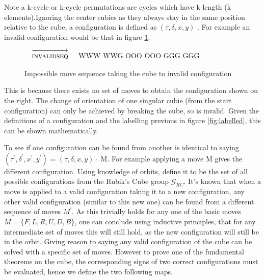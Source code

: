 \documentclass{article}
\newcounter{theo}[section]\setcounter{theo}{0}
\newcounter{lem}[section]\setcounter{lem}{0}
\begin{document}
Note a k-cycle or k-cycle permutations are cycles which have k length (k elements).\newline Ignoring the center cubies as they always stay in the same position relative to the cube, a configuration is defined as \textbf{$(\tau,\delta, x, y)$ }. For example an invalid configuration would be that in figure \ref{fig:invalid}.

\newcommand{\invalidseq}{[invalidseq],F2,F2}%
\newcommand{\invalidseqarrow}{$\quad\overrightarrow{\strut\textsc{invalidseq}}\quad$}

\begin{figure}
\centering
  \RubikCubeSolved%
  \invalidseqarrow
  \RubikRotation{\invalidseq}
   {W}{W}{W} {W}{W}{G}%
   {O}{O}{O} {O}{O}{O}%
   {G}{G}{G} {G}{G}{G}%
\caption{Impossible move sequence taking the cube to invalid configuration}
\label{fig:invalid}
\end{figure}
\vspace{20pt}
This is because there exists no set of moves to obtain the configuration shown on the right. The change of orientation of one singular cubie (from the start configuration) can only be achieved by breaking the cube, so is invalid. Given the definitions of a configuration and the labelling previous in figure \ref{fig:labelled}, this can be shown mathematically. 


To see if one configuration can be found from another is identical to saying $(\tau^{'} ,\delta^{'} , x^{'} , y^{'} )$ = $(\tau,\delta, x, y) \cdot$ M. For example applying a move M gives the different configuration. Using knowledge of orbits, define it to be the set of all possible configurations from the Rubik's Cube group $\mathcal{G}_{RC}$. It's known that when a move is applied to a valid configuration taking it to a new configuration, any other valid configuration (similar to this new one) can be found from a different sequence of moves $M^{'}$. As this trivially holds for any one of the basic moves $M= \{{F,L,R,U,D,B}\}$, one can conclude using inductive principles, that for any intermediate set of moves this will still hold, as the new configuration will still be in the orbit. Giving reason to saying any valid configuration of the cube can be solved with a specific set of moves. However to prove one of the fundamental theorems on the cube, the corresponding signs of two correct configurations must be evaluated, hence we define the two following maps.
\end{document}
